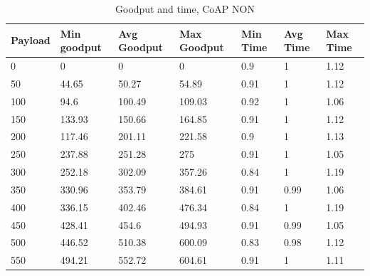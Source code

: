 \begin{table}[H]
\scriptsize
\centering
\caption{Goodput and time, CoAP NON}
\label{goodputTimeCON}
\begin{tabular}{|l|l|l|l|l|l|l|}
\hline
\textbf{Payload} & \textbf{Min goodput} & \textbf{Avg Goodput} & \textbf{Max Goodput} & \textbf{Min Time} & \textbf{Avg Time} & \textbf{Max Time} \\ \hline
0                & 0                    & 0                    & 0                    & 0.9               & 1                 & 1.12              \\ \hline
50               & 44.65                & 50.27                & 54.89                & 0.91              & 1                 & 1.12              \\ \hline
100              & 94.6                 & 100.49               & 109.03               & 0.92              & 1                 & 1.06              \\ \hline
150              & 133.93               & 150.66               & 164.85               & 0.91              & 1                 & 1.12              \\ \hline
200              & 117.46               & 201.11               & 221.58               & 0.9               & 1                 & 1.13              \\ \hline
250              & 237.88               & 251.28               & 275                  & 0.91              & 1                 & 1.05              \\ \hline
300              & 252.18               & 302.09               & 357.26               & 0.84              & 1                 & 1.19              \\ \hline
350              & 330.96               & 353.79               & 384.61               & 0.91              & 0.99              & 1.06              \\ \hline
400              & 336.15               & 402.46               & 476.34               & 0.84              & 1                 & 1.19              \\ \hline
450              & 428.41               & 454.6                & 494.93               & 0.91              & 0.99              & 1.05              \\ \hline
500              & 446.52               & 510.38               & 600.09               & 0.83              & 0.98              & 1.12              \\ \hline
550              & 494.21               & 552.72               & 604.61               & 0.91              & 1                 & 1.11              \\ \hline

\end{tabular}
\end{table}
